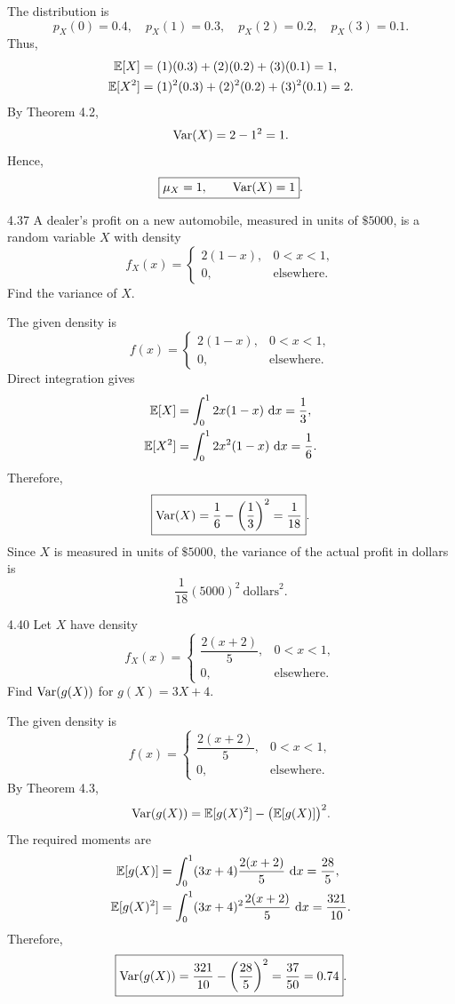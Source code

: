 \documentclass[11pt,oneside]{article}
\begin{document}
\begin{solution}
The distribution is
\[
    p_X(0)=0.4,\quad p_X(1)=0.3,\quad p_X(2)=0.2,\quad p_X(3)=0.1.
\]
Thus,
\[
\begin{aligned}
    \mathbb{E}[X]&=(1)(0.3)+(2)(0.2)+(3)(0.1)=1,\\
    \mathbb{E}[X^2]&=(1)^2(0.3)+(2)^2(0.2)+(3)^2(0.1)=2.
\end{aligned}
\]
By Theorem 4.2,
\[
    \operatorname{Var}(X)=2-1^2=1.
\]
Hence,
\[
    \boxed{\mu_X=1,\qquad \operatorname{Var}(X)=1}.
\]
\end{solution}

\begin{exercise}{4.37}
A dealer's profit on a new automobile, measured in units of $\$5000$, is a random variable $X$ with density
\[
f_X(x)=\begin{cases}2(1-x),&0<x<1,\\0,&\text{elsewhere}.\end{cases}
\]
Find the variance of $X$.
\end{exercise}

\begin{solution}
The given density is
\[
    f(x)=
    \begin{cases}
        2(1-x), & 0<x<1,\\
        0, & \text{elsewhere}.
    \end{cases}
\]
Direct integration gives
\[
\begin{aligned}
    \mathbb{E}[X]
    &=\int_0^1 2x(1-x)\,\mathop{}\!\mathrm{d} x=\frac13,\\
    \mathbb{E}[X^2]
    &=\int_0^1 2x^2(1-x)\,\mathop{}\!\mathrm{d} x=\frac16.
\end{aligned}
\]
Therefore,
\[
    \boxed{\operatorname{Var}(X)=\frac16-\left(\frac13\right)^2=\frac1{18}}.
\]
Since $X$ is measured in units of $\$5000$, the variance of the actual profit in dollars is
\[
    \frac1{18}(5000)^2\ \text{dollars}^2.
\]
\end{solution}

\begin{exercise}{4.40}
Let $X$ have density
\[
f_X(x)=\begin{cases}\dfrac{2(x+2)}{5},&0<x<1,\\0,&\text{elsewhere}.\end{cases}
\]
Find $\operatorname{Var}(g(X))$ for $g(X)=3X+4$.
\end{exercise}

\begin{solution}
The given density is
\[
    f(x)=
    \begin{cases}
        \dfrac{2(x+2)}{5}, & 0<x<1,\\
        0, & \text{elsewhere}.
    \end{cases}
\]
By Theorem 4.3,
\[
    \operatorname{Var}(g(X))=\mathbb{E}[g(X)^2]-\bigl(\mathbb{E}[g(X)]\bigr)^2.
\]
The required moments are
\[
\begin{aligned}
    \mathbb{E}[g(X)]
    &=\int_0^1 (3x+4)\frac{2(x+2)}5\,\mathop{}\!\mathrm{d} x
      =\frac{28}{5},\\
    \mathbb{E}[g(X)^2]
    &=\int_0^1 (3x+4)^2\frac{2(x+2)}5\,\mathop{}\!\mathrm{d} x
      =\frac{321}{10}.
\end{aligned}
\]
Therefore,
\[
    \boxed{\operatorname{Var}(g(X))
    =\frac{321}{10}-\left(\frac{28}{5}\right)^2
    =\frac{37}{50}=0.74}.
\]
\end{solution}
\end{document}
